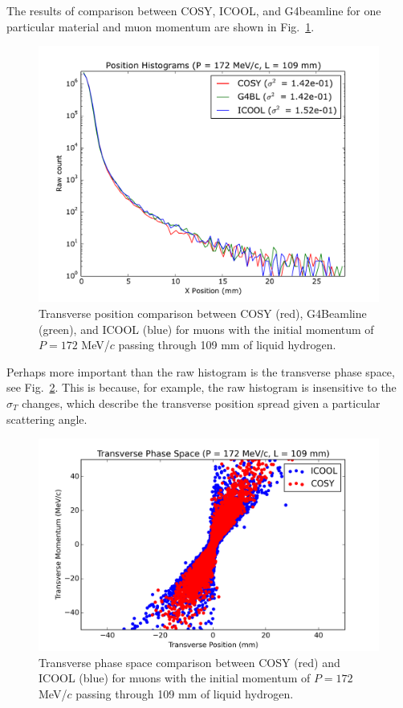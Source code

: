 \documentclass{jacow}
\begin{document}
The results of comparison between COSY, ICOOL, and G4beamline for one particular material and muon momentum are shown in Fig.~\ref{fig:transverse}.

\begin{figure}[htbf]
\centering
\includegraphics[width=\columnwidth]{transverse.pdf}
\caption{Transverse position comparison between COSY (red), G4Beamline (green), and ICOOL (blue) for muons with the initial momentum of $P=172$ MeV/$c$ passing through 109 mm of liquid hydrogen.}
\label{fig:transverse}
\end{figure}

Perhaps more important than the raw histogram is the transverse phase space, see Fig.~\ref{fig:transverse_phase_space}. This is because, for example, the raw histogram is insensitive to the $\sigma_T$ changes, which describe the transverse position spread given a particular scattering angle.

\begin{figure}[htbf]
\centering
\includegraphics[width=\columnwidth]{transverse_phase_space}
\caption{Transverse phase space comparison between COSY (red) and ICOOL (blue) for muons with the initial momentum of $P=172$ MeV/$c$ passing through 109 mm of liquid hydrogen.}
\label{fig:transverse_phase_space}
\end{figure}
\end{document}
